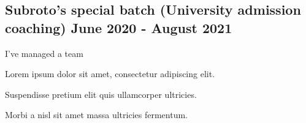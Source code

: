 \documentclass[a4paper,12pt]{article}
\begin{document}


\subsection{{Subroto's special batch (University admission coaching) \hfill June 2020 - August 2021}}
\vspace*{3pt}
I've managed a team
\begin{zitemize}
\item Lorem ipsum dolor sit amet, consectetur adipiscing elit.
\item Suspendisse pretium elit quis ullamcorper ultricies.
\item Morbi a nisl sit amet massa ultricies fermentum.
\end{zitemize}
\end{document}
